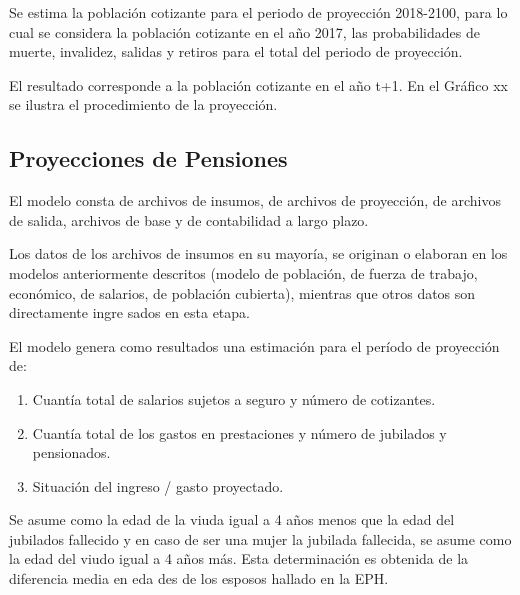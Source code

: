 Se estima la población cotizante para el periodo de proyección
2018-2100, para lo cual se considera la población cotizante en el año
2017, las probabilidades de muerte, invalidez, salidas y retiros para el
total del periodo de proyección.

El resultado corresponde a la población cotizante en el año t+1. En el
Gráfico xx se ilustra el procedimiento de la proyección.

\subsection{Proyecciones de Pensiones}

El modelo consta de archivos de insumos, de archivos de proyección, de
archivos de salida, archivos de base y de contabilidad a largo plazo.

Los datos de los archivos de insumos en su mayoría, se originan o
elaboran en los modelos anteriormente descritos (modelo de población, de
fuerza de trabajo, económico, de salarios, de población cubierta),
mientras que otros datos son directamente ingre sados en esta etapa.

El modelo genera como resultados una estimación para el período de
proyección de:

\begin{enumerate}
\item   Cuantía total de salarios sujetos a seguro y número de cotizantes.
\item   Cuantía total de los gastos en prestaciones y número de jubilados y pensionados.
\item   Situación del ingreso / gasto proyectado.
\end{enumerate}

Se asume como la edad de la viuda igual a 4 años menos que la edad del
jubilados fallecido y en caso de ser una mujer la jubilada fallecida, se
asume como la edad del viudo igual a 4 años más. Esta determinación es
obtenida de la diferencia media en eda des de los esposos hallado en la
EPH.

